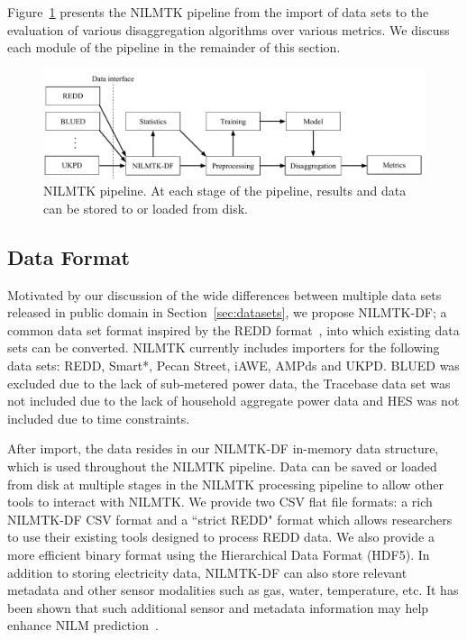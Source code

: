 \documentclass{sig-alternate}
\newcommand{\bluecolor}[1]{\textcolor{blue}{#1}}
\newcommand{\figref}[1]{Figure~\ref{#1}}
\newcommand{\secref}[1]{Section~\ref{#1}}
\begin{document}
\figref{fig:pipeline} presents the NILMTK pipeline from the import of data sets to the evaluation of various disaggregation algorithms over various metrics. We discuss each module of the pipeline in the remainder of this section.

\begin{figure}
\centering \includegraphics[scale=0.6]{figures/pipeline.pdf}
\caption{NILMTK pipeline. At each stage of the pipeline, results and data can be stored to or loaded from disk.}
\label{fig:pipeline}
\end{figure}


\subsection{Data Format}%
\label{sec:data_format} 

\noindent
Motivated by our discussion of the wide differences between multiple data sets released in public domain in \secref{sec:datasets}, we propose NILMTK-DF; a common
data set format inspired by the REDD format~\cite{redd}, into which
existing data sets can be converted. NILMTK currently includes
importers for the following data sets: REDD, Smart*, Pecan Street, iAWE, AMPds
and UKPD. BLUED was excluded due to the lack of sub-metered power data, the Tracebase data set was not included due to the lack of household aggregate power data and HES was not included due to time constraints.

After import, the data resides in our NILMTK-DF in-memory data structure, which is used throughout the NILMTK pipeline. Data can be saved or loaded from disk at multiple stages in the NILMTK processing pipeline to allow other tools to interact with NILMTK.  We provide two CSV flat file formats: a rich NILMTK-DF CSV format and a ``strict REDD" format which allows researchers to use their existing tools designed to process REDD data.  We also provide a more efficient binary format using the Hierarchical Data Format (HDF5).  In addition to storing electricity data, NILMTK-DF can also store relevant metadata and other sensor modalities such as gas, water, temperature, etc. It has been shown that such additional sensor and metadata information may help enhance NILM prediction~\cite{schoofs_2010}. 
\end{document}
